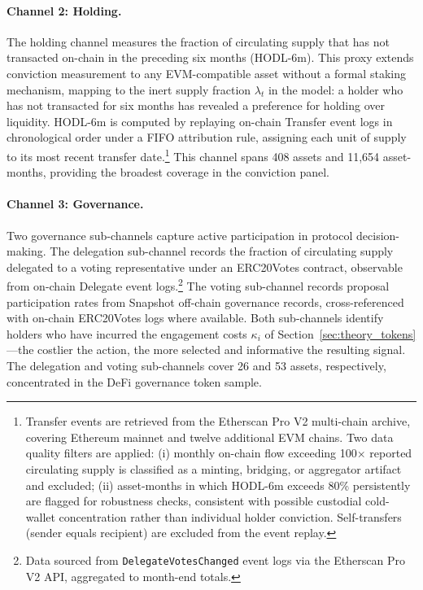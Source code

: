 \documentclass[12pt]{article}
\begin{document}
\paragraph{Channel 2: Holding.}
The holding channel measures the fraction of circulating supply that has not transacted
on-chain in the preceding six months (HODL-6m). This proxy extends conviction measurement
to any EVM-compatible asset without a formal staking mechanism, mapping to the inert
supply fraction $\lambda_t$ in the model: a holder who has not transacted for six months
has revealed a preference for holding over liquidity. HODL-6m is computed by replaying
on-chain Transfer event logs in chronological order under a FIFO attribution rule,
assigning each unit of supply to its most recent transfer date.\footnote{Transfer events
are retrieved from the Etherscan Pro V2 multi-chain archive, covering Ethereum mainnet and
twelve additional EVM chains. Two data quality filters are applied: (i) monthly on-chain
flow exceeding 100$\times$ reported circulating supply is classified as a minting,
bridging, or aggregator artifact and excluded; (ii) asset-months in which HODL-6m exceeds
80\% persistently are flagged for robustness checks, consistent with possible custodial
cold-wallet concentration rather than individual holder conviction. Self-transfers (sender
equals recipient) are excluded from the event replay.} This channel spans 408 assets and
11,654 asset-months, providing the broadest coverage in the conviction panel.

\paragraph{Channel 3: Governance.}
Two governance sub-channels capture active participation in protocol decision-making.
The delegation sub-channel records the fraction of circulating supply delegated to a
voting representative under an ERC20Votes contract, observable from on-chain Delegate
event logs.\footnote{Data sourced from \texttt{DelegateVotesChanged} event logs via the
Etherscan Pro V2 API, aggregated to month-end totals.} The voting sub-channel records
proposal participation rates from Snapshot off-chain governance records, cross-referenced
with on-chain ERC20Votes logs where available. Both sub-channels identify holders who
have incurred the engagement costs $\kappa_i$ of Section~\ref{sec:theory_tokens}---the
costlier the action, the more selected and informative the resulting signal. The
delegation and voting sub-channels cover 26 and 53 assets, respectively, concentrated in
the DeFi governance token sample.
\end{document}
